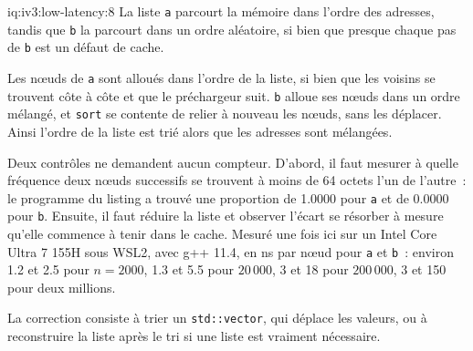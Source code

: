 \begin{solution}{iq:iv3:low-latency:8}
La liste \texttt{a} parcourt la mémoire dans l'ordre des adresses, tandis que \texttt{b} la parcourt dans un ordre aléatoire, si bien que presque chaque pas de \texttt{b} est un défaut de cache.

Les nœuds de \texttt{a} sont alloués dans l'ordre de la liste, si bien que les voisins se trouvent côte à côte et que le préchargeur suit. \texttt{b} alloue ses nœuds dans un ordre mélangé, et \texttt{sort} se contente de relier à nouveau les nœuds, sans les déplacer. Ainsi l'ordre de la liste est trié alors que les adresses sont mélangées.

Deux contrôles ne demandent aucun compteur. D'abord, il faut mesurer à quelle fréquence deux nœuds successifs se trouvent à moins de 64 octets l'un de l'autre~: le programme du listing a trouvé une proportion de 1.0000 pour \texttt{a} et de 0.0000 pour \texttt{b}. Ensuite, il faut réduire la liste et observer l'écart se résorber à mesure qu'elle commence à tenir dans le cache. Mesuré une fois ici sur un Intel Core Ultra 7 155H sous WSL2, avec g++ 11.4, en ns par nœud pour \texttt{a} et \texttt{b}~: environ 1.2 et 2.5 pour $n = 2000$, 1.3 et 5.5 pour $20\,000$, 3 et 18 pour $200\,000$, 3 et 150 pour deux millions.

La correction consiste à trier un \texttt{std::vector}, qui déplace les valeurs, ou à reconstruire la liste après le tri si une liste est vraiment nécessaire.

\end{solution}

